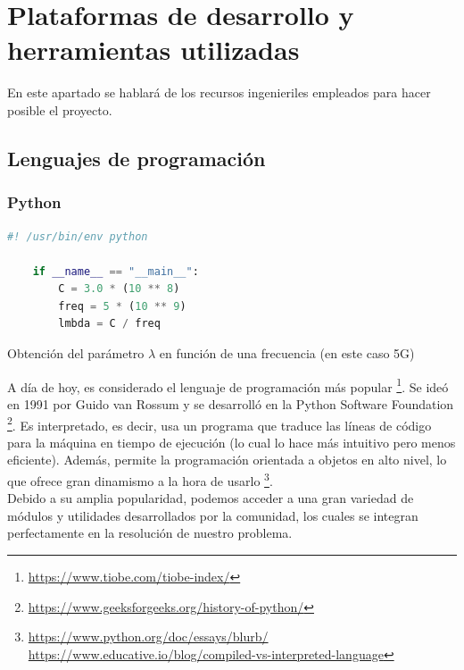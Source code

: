 \chapter{Plataformas de desarrollo y herramientas utilizadas}
\label{cap:capitulo3}

En este apartado se hablará de los recursos ingenieriles empleados para hacer posible el proyecto.

\section{Lenguajes de programación}
\label{sec:lenguajes_programacion}

\subsection{Python}
\label{subsec:python}

\begin{code}[hp]
	\begin{lstlisting}[language=Python]
	#! /usr/bin/env python
	
	if __name__ == "__main__":
		C = 3.0 * (10 ** 8)
		freq = 5 * (10 ** 9)
		lmbda = C / freq
	\end{lstlisting}
	\caption[Obtención del parámetro lambda en función de una frecuencia (en este caso 5G)]{Obtención del parámetro $\lambda$ en función de una frecuencia (en este caso 5G)}
	\label{cod:helloworld_python}
\end{code}

A día de hoy, es considerado el lenguaje de programación más popular \footnote[1]{\url{https://www.tiobe.com/tiobe-index/}}. Se ideó en 1991 por Guido van Rossum y se desarrolló en la Python Software Foundation \footnote[2]{\url{https://www.geeksforgeeks.org/history-of-python/}}. Es interpretado, es decir, usa un programa que traduce las líneas de código para la máquina en tiempo de ejecución (lo cual lo hace más intuitivo pero menos eficiente). Además, permite la programación orientada a objetos en alto nivel, lo que ofrece gran dinamismo a la hora de usarlo \footnote[3]{\url{https://www.python.org/doc/essays/blurb/} \url{https://www.educative.io/blog/compiled-vs-interpreted-language}}.\\

Debido a su amplia popularidad, podemos acceder a una gran variedad de módulos y utilidades desarrollados por la comunidad, los cuales se integran perfectamente en la resolución de nuestro problema.\\

